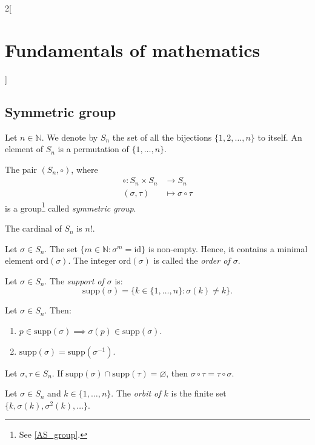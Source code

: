 \documentclass[../../../main.tex]{subfiles}
\begin{document}
\begin{multicols}{2}[\section{Fundamentals of mathematics}]
  \subsection{Symmetric group}
  \begin{definition}
    Let $n\in\mathbb{N}$. We denote by $S_n$ the set of all the bijections $\{1,2,\ldots,n\}$ to itself. An element of $S_n$ is a permutation of $\{1,\ldots,n\}$.
  \end{definition}
  \begin{prop}
    The pair $(S_n,\circ)$, where
    \begin{align*}
      \circ:S_n\times S_n & \longrightarrow S_n        \\
      (\sigma,\tau)       & \longmapsto\sigma\circ\tau
    \end{align*}
    is a group\footnote{See \cref{AS_group}.} called \textit{symmetric group}.
  \end{prop}
  \begin{theorem}
    The cardinal of $S_n$ is $n!$.
  \end{theorem}
  \begin{definition}
    Let $\sigma\in S_n$. The set $\{m\in\mathbb{N}:\sigma^m=\text{id}\}$ is non-empty. Hence, it contains a minimal element $\text{ord}(\sigma)$. The integer $\text{ord}(\sigma)$ is called the \textit{order of $\sigma$}.
  \end{definition}
  \begin{definition}
    Let $\sigma\in S_n$. The \textit{support of $\sigma$} is: $$\text{supp}(\sigma)=\{k\in\{1,\ldots,n\}: \sigma(k)\ne k\}.$$
  \end{definition}
  \begin{lemma}
    Let $\sigma\in S_n$. Then:
    \begin{enumerate}
      \item $p\in\text{supp}(\sigma)\implies \sigma(p)\in\text{supp}(\sigma)$.
      \item $\text{supp}(\sigma)=\text{supp}(\sigma^{-1})$.
    \end{enumerate}
  \end{lemma}
  \begin{lemma}
    Let $\sigma,\tau\in S_n$. If $\text{supp}(\sigma)\cap\text{supp}(\tau)=\varnothing$, then $\sigma\circ \tau=\tau\circ \sigma$.
  \end{lemma}
  \begin{definition}
    Let $\sigma\in S_n$ and $k\in\{1,\ldots,n\}$. The \textit{orbit of $k$} is the finite set $\{k,\sigma(k),\sigma^2(k),\ldots\}$.

\end{definition}
\end{multicols}
\end{document}
